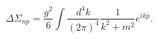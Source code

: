 \begin{equation}
 \Delta\Sigma_{np} = \frac{g^2}6
 \int \frac{d^4k}{(2\pi)^4} \frac1{k^2+m^2}
 e^{ik\tilde p}.
\end{equation}

